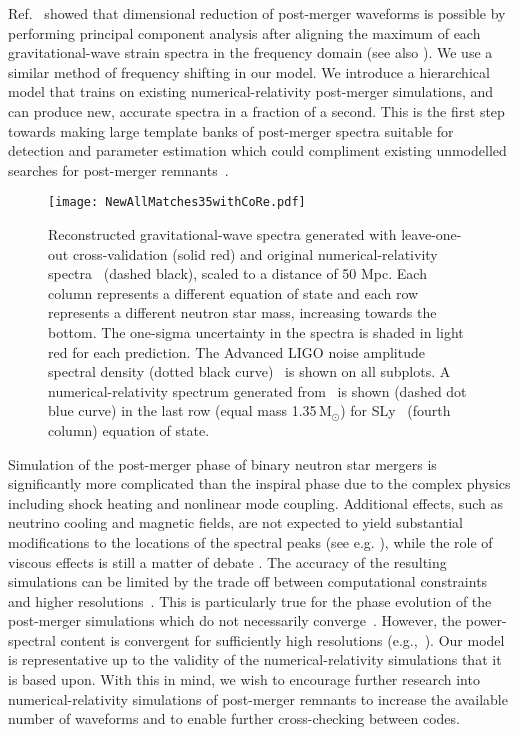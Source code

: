 \documentclass[../Thesis.tex]{subfiles}
\begin{document}
    Ref.~\cite{Clark2016postmerger} showed that dimensional reduction of post-merger waveforms is possible by performing principal component analysis after aligning the maximum of each gravitational-wave strain spectra in the frequency domain (see also \cite{Bose2018}). We use a similar method of frequency shifting in our model. We introduce a hierarchical model that trains on existing numerical-relativity post-merger simulations, and can produce new, accurate spectra in a fraction of a second. This is the first step towards making large template banks of post-merger spectra suitable for detection and parameter estimation which could compliment existing unmodelled searches for post-merger remnants~\cite{GW170817Properties,Klimenko2016,Chatziioannou2017}. \par
\begin{figure*}
    \texttt{[image: NewAllMatches35withCoRe.pdf]} 
    \caption{ Reconstructed gravitational-wave spectra generated with leave-one-out cross-validation (solid red) and original numerical-relativity spectra~\cite{Rezzolla2016} (dashed black), scaled to a distance of 50 Mpc. Each column represents a different equation of state and each row represents a different neutron star mass, increasing towards the bottom. The one-sigma uncertainty in the spectra is shaded in light red for each prediction.  The Advanced LIGO noise amplitude spectral density (dotted black curve)~\cite{PSD:aLIGO} is shown on all subplots. A numerical-relativity spectrum generated from~\cite{Dietrich2018} is shown (dashed dot blue curve) in the last row (equal mass 1.35\,M$_\odot$) for SLy~\cite{Radice2016} (fourth column) equation of state.}
    \label{fig:GoodPlotsWithWaveformGeneration}
\end{figure*} 
    Simulation of the post-merger phase of binary neutron star mergers is significantly more complicated than the inspiral phase due to the complex physics including shock heating and nonlinear mode coupling. Additional effects, such as neutrino cooling and magnetic fields, are not expected to yield substantial modifications to the locations of the spectral peaks (see e.g. \cite{Giacomazzo2011,Sekiguchi2016,Kawamura2016}), while the role of viscous effects is still a matter of debate \cite{Alford2018}. The accuracy of the resulting simulations can be limited by the trade off between computational constraints and higher resolutions~\cite{Baiotti2017}. This is particularly true for the phase evolution of the post-merger simulations which do not necessarily converge~\cite{Dietrich2018}. However, the power-spectral content is convergent for sufficiently high resolutions (e.g.,~\cite{Takami2015,Dietrich2018}). Our model is representative up to the validity of the numerical-relativity simulations that it is based upon. With this in mind, we wish to encourage further research into numerical-relativity simulations of post-merger remnants to increase the available number of waveforms and to enable further cross-checking between codes.\par
\end{document}
